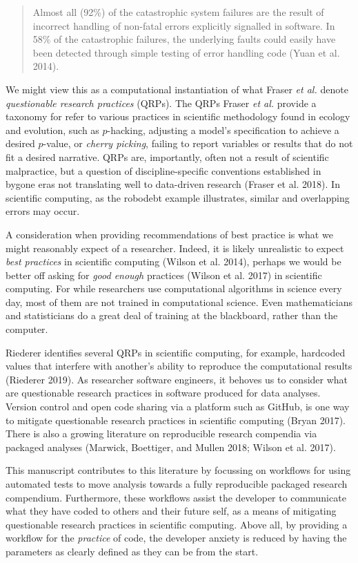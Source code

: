 \documentclass[
]{article}
\begin{document}
\begin{quote}
Almost all (92\%) of the catastrophic system failures are the result of
incorrect handling of non-fatal errors explicitly signalled in software.
In 58\% of the catastrophic failures, the underlying faults could easily
have been detected through simple testing of error handling code (Yuan
et al. 2014).
\end{quote}

We might view this as a computational instantiation of what Fraser
\emph{et al.} denote \emph{questionable research practices} (QRPs). The
QRPs Fraser \emph{et al.} provide a taxonomy for refer to various
practices in scientific methodology found in ecology and evolution, such
as \(p\)-hacking, adjusting a model's specification to achieve a desired
\(p\)-value, or \emph{cherry picking}, failing to report variables or
results that do not fit a desired narrative. QRPs are, importantly,
often not a result of scientific malpractice, but a question of
discipline-specific conventions established in bygone eras not
translating well to data-driven research (Fraser et al. 2018). In
scientific computing, as the robodebt example illustrates, similar and
overlapping errors may occur.

A consideration when providing recommendations of best practice is what
we might reasonably expect of a researcher. Indeed, it is likely
unrealistic to expect \emph{best practices} in scientific computing
(Wilson et al. 2014), perhaps we would be better off asking for
\emph{good enough} practices (Wilson et al. 2017) in scientific
computing. For while researchers use computational algorithms in science
every day, most of them are not trained in computational science. Even
mathematicians and statisticians do a great deal of training at the
blackboard, rather than the computer.

Riederer identifies several QRPs in scientific computing, for example,
hardcoded values that interfere with another's ability to reproduce the
computational results (Riederer 2019). As researcher software engineers,
it behoves us to consider what are questionable research practices in
software produced for data analyses. Version control and open code
sharing via a platform such as GitHub, is one way to mitigate
questionable research practices in scientific computing (Bryan 2017).
There is also a growing literature on reproducible research compendia
via packaged analyses (Marwick, Boettiger, and Mullen 2018; Wilson et
al. 2017).

This manuscript contributes to this literature by focussing on workflows
for using automated tests to move analysis towards a fully reproducible
packaged research compendium. Furthermore, these workflows assist the
developer to communicate what they have coded to others and their future
self, as a means of mitigating questionable research practices in
scientific computing. Above all, by providing a workflow for the
\emph{practice} of code, the developer anxiety is reduced by having the
parameters as clearly defined as they can be from the start.
\end{document}
